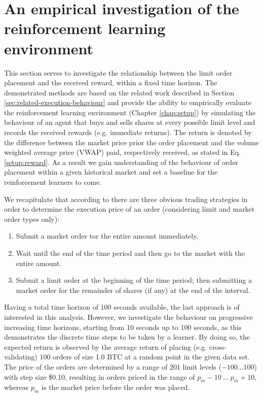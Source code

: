\section{An empirical investigation of the reinforcement learning environment}
\label{sec:eval-empirical}
This section serves to investigate the relationship between the limit order placement and the received reward, within a fixed time horizon.
The demonstrated methods are based on the related work described in Section \ref{sec:related-execution-behaviour} and provide the ability to empirically evaluate the reinforcement learning environment (Chapter \ref{chap:setup}) by simulating the behaviour of an agent that buys and sells shares at every possible limit level and records the received rewards (e.g. immediate returns).
The return is denoted by the difference between the market price prior the order placement and the volume weighted average price (VWAP) paid, respectively received, as stated in Eq. \ref{setup:reward}.
As a result we gain understanding of the behaviour of order placement within a given historical market and set a baseline for the reinforcement learners to come.

We recapitulate that according to \cite{nevmyvaka2005electronic, yingsaeree2012algorithmic} there are three obvious trading strategies in order to determine the execution price of an order (considering limit and market order types only):
\begin{enumerate}
    \item Submit a market order tor the entire amount immediately.
    \item Wait until the end of the time period and then go to the market with the entire amount.
    \item Submit a limit order at the beginning of the time period; then submitting a market order for the remainder of shares (if any) at the end of the interval.
\end{enumerate}
Having a total time horizon of 100 seconds available, the last approach is of interested in this analysis.
However, we investigate the behaviour on progressive increasing time horizons, starting from 10 seconds up to 100 seconds, as this demonstrates the discrete time steps to be taken by a learner.
By doing so, the expected return is observed by the average return of placing (e.g. cross-validating) 100 orders of size 1.0 BTC at a random point in the given data set.
The price of the orders are determined by a range of 201 limit levels ($-100...100$) with step size \$0.10, resulting in orders priced in the range of $p_m-10 \ \dots \ p_m+10$, whereas $p_m$ is the market price before the order was placed.

